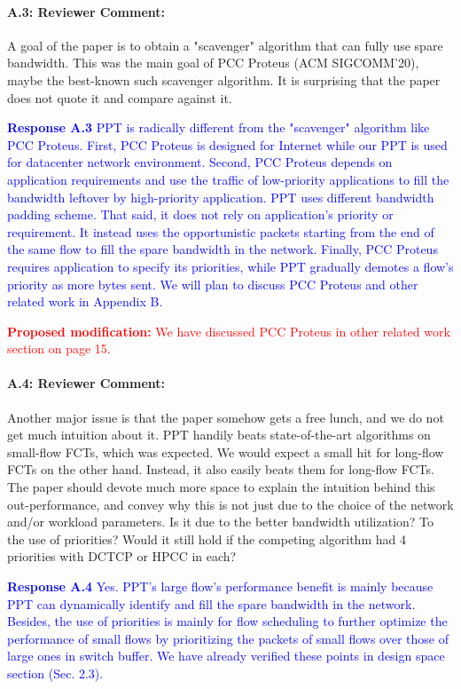 \documentclass[12pt,one-column]{article}
\begin{document}
{\it \paragraph{A.3: Reviewer Comment:} A goal of the paper is to obtain a "scavenger" algorithm that can fully use spare bandwidth. This was the main goal of PCC Proteus (ACM SIGCOMM'20), maybe the best-known such scavenger algorithm. It is surprising that the paper does not quote it and compare against it.}

\noindent\textcolor{blue}{\textbf{Response A.3}
PPT is radically different from the "scavenger" algorithm like PCC Proteus.
First, PCC Proteus is designed for Internet while our PPT is used for datacenter network environment.
Second, PCC Proteus depends on application requirements and use the traffic of low-priority applications to fill the bandwidth leftover by high-priority application. PPT uses different bandwidth padding scheme. That said, it does not rely on application's priority or requirement. It instead uses the opportunistic packets starting from the end of the same flow to fill the spare bandwidth in the network.
Finally, PCC Proteus requires application to specify its priorities, while PPT gradually demotes a flow's priority as more bytes sent. We will plan to discuss PCC Proteus and other related work in Appendix B.
} 

\noindent\textcolor{red}{\textbf{Proposed modification: }
We have discussed PCC Proteus in other related work section on page 15.
}

{\it \paragraph{A.4: Reviewer Comment:}Another major issue is that the paper somehow gets a free lunch, and we do not get much intuition about it. PPT handily beats state-of-the-art algorithms on small-flow FCTs, which was expected. We would expect a small hit for long-flow FCTs on the other hand. Instead, it also easily beats them for long-flow FCTs. The paper should devote much more space to explain the intuition behind this out-performance, and convey why this is not just due to the choice of the network and/or workload parameters. Is it due to the better bandwidth utilization? To the use of priorities? Would it still hold if the competing algorithm had 4 priorities with DCTCP or HPCC in each?}

\noindent\textcolor{blue}{\textbf{Response A.4}
Yes. PPT's large flow's performance benefit is mainly because PPT can dynamically identify and fill the spare bandwidth in the network.
Besides, the use of priorities is mainly for flow scheduling to further optimize the performance of small flows by prioritizing the packets of small flows over those of large ones in switch buffer. 
We have already verified these points in design space section (Sec. 2.3).}
\end{document}
